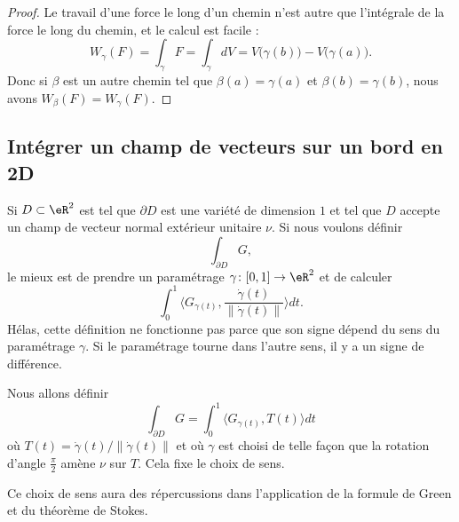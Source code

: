 \begin{proof}
	Le travail d'une force le long d'un chemin n'est autre que l'intégrale de la force le long du chemin, et le calcul est facile :
	\begin{equation}
		W_{\gamma}(F)=\int_{\gamma}F=\int_{\gamma}dV=V\big( \gamma(b) \big)-V\big( \gamma(a) \big).
	\end{equation}
	Donc si \( \beta\) est un autre chemin tel que \( \beta(a)=\gamma(a)\) et \( \beta(b)=\gamma(b)\), nous avons \( W_{\beta}(F)=W_{\gamma}(F)\).
\end{proof}

\subsection{Intégrer un champ de vecteurs sur un bord en 2D}

Si \( D\subset\eR^2\) est tel que \( \partial D\) est une variété de dimension \( 1\) et tel que \( D\) accepte un champ de vecteur normal extérieur unitaire \( \nu\). Si nous voulons définir
\begin{equation}
	\int_{\partial D}G,
\end{equation}
le mieux est de prendre un paramétrage \( \gamma\colon \mathopen[ 0 , 1 \mathclose]\to \eR^2\) et de calculer
\begin{equation}
	\int_0^1 \langle G_{\gamma(t)}, \frac{ \dot\gamma(t) }{ \| \dot\gamma(t) \| }\rangle dt.
\end{equation}
Hélas, cette définition ne fonctionne pas parce que son signe dépend du sens du paramétrage \( \gamma\). Si le paramétrage tourne dans l'autre sens, il y a un signe de différence.

Nous allons définir
\begin{equation}		\label{EqIntVectbordDeux}
	\int_{\partial D}G=\int_0^1\langle G_{\gamma(t)}, T(t)\rangle dt
\end{equation}
où \( T(t)=\dot\gamma(t)/\| \dot\gamma(t) \|\) et où \( \gamma\) est choisi de telle façon que la rotation d'angle \( \frac{ \pi }{ 2 }\) amène \( \nu\) sur \( T\). Cela fixe le choix de sens.

Ce choix de sens aura des répercussions dans l'application de la formule de Green et du théorème de Stokes.

